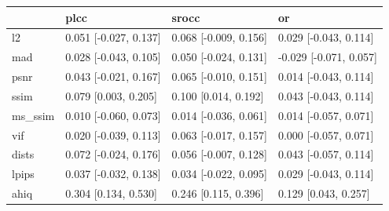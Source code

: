\begin{tabular}{llll}
\toprule
 & plcc & srocc & or \\
\midrule
l2 & 0.051 [-0.027, 0.137] & 0.068 [-0.009, 0.156] & 0.029 [-0.043, 0.114] \\
mad & 0.028 [-0.043, 0.105] & 0.050 [-0.024, 0.131] & -0.029 [-0.071, 0.057] \\
psnr & 0.043 [-0.021, 0.167] & 0.065 [-0.010, 0.151] & 0.014 [-0.043, 0.114] \\
ssim & 0.079 [0.003, 0.205] & 0.100 [0.014, 0.192] & 0.043 [-0.043, 0.114] \\
ms_ssim & 0.010 [-0.060, 0.073] & 0.014 [-0.036, 0.061] & 0.014 [-0.057, 0.071] \\
vif & 0.020 [-0.039, 0.113] & 0.063 [-0.017, 0.157] & 0.000 [-0.057, 0.071] \\
dists & 0.072 [-0.024, 0.176] & 0.056 [-0.007, 0.128] & 0.043 [-0.057, 0.114] \\
lpips & 0.037 [-0.032, 0.138] & 0.034 [-0.022, 0.095] & 0.029 [-0.043, 0.114] \\
ahiq & 0.304 [0.134, 0.530] & 0.246 [0.115, 0.396] & 0.129 [0.043, 0.257] \\
\bottomrule
\end{tabular}
